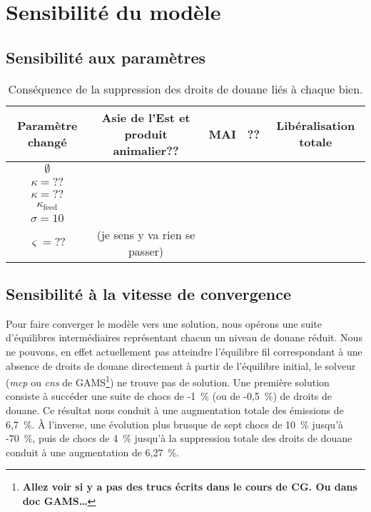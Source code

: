 \section{Sensibilité du modèle}

\subsection{Sensibilité aux paramètres}

\begin{table}[hbt!]
    \centering

    \begin{tabular}{c|cccc}
        Paramètre changé     & Asie de l'Est et produit animalier?? & MAI & ?? & Libéralisation totale \\ \hline
        $\emptyset$          &                                      &     &    &                       \\
        $\kappa = ??$        &                                      &     &    &                       \\
        $\kappa = ??$        &                                      &     &    &                       \\
        $\kappa_\text{feed}$ &                                      &     &    &                       \\
        $\sigma = 10$        &                                      &     &    &                       \\
        $\varsigma =  ??$    & (je sens y va rien se passer)                                           \\
    \end{tabular}%

    \caption{Conséquence de la suppression des droits de douane liés à chaque bien.}
    \label{tab:sensibilite_param}
\end{table}

\subsection{Sensibilité à la vitesse de convergence}\label{subsec:vit_cvg}

Pour faire converger le modèle vers une solution, nous opérons une suite d'équilibres intermédiaires représentant chacun un niveau de douane réduit. Nous ne pouvons, en effet actuellement pas atteindre l'équilibre fil correspondant à une absence de droits de douane directement à partir de l'équilibre initial, le solveur (\textit{mcp} ou \textit{cns} de GAMS\footnote{\textbf{Allez voir si y a pas des trucs écrits dans le cours de CG. Ou dans doc GAMS\dots}}) ne trouve pas de solution. Une première solution consiste à succéder une suite de chocs de -1~\% (ou de -0,5~\%) de droits de douane. Ce résultat nous conduit à une augmentation totale des émissions de 6,7~\%. À l'inverse, une évolution plus brusque de sept chocs de 10~\% jusqu'à -70~\%, puis de chocs de 4~\% jusqu'à la suppression totale des droits de douane conduit à une augmentation de 6,27~\%.

